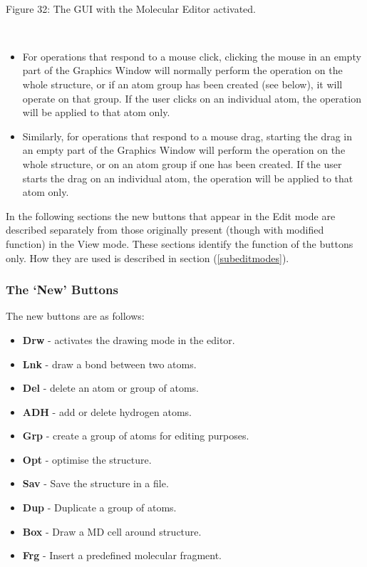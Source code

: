 ~

\begin{center}
\centerline{}
\centerline{Figure 32: The GUI with the Molecular Editor activated.}
\end{center}

~

\noindent
\begin{itemize}
\item For operations that respond to a mouse click, clicking the mouse in an
  empty part of the Graphics Window will normally perform the operation on the
  whole structure, or if an atom group has been created (see below), it will
  operate on that group. If the user clicks on an individual atom, the
  operation will be applied to that atom only.
\item Similarly, for operations that respond to a mouse drag, starting the
  drag in an empty part of the Graphics Window will perform the operation on
  the whole structure, or on an atom group if one has been created. If the
  user starts the drag on an individual atom, the operation will be applied to
  that atom only.
\end{itemize}

In the following sections the new buttons that appear in the Edit mode are
described separately from those originally present (though with modified
function) in the View mode. These sections identify the function of the
buttons only. How they are used is described in section (\ref{subeditmodes}).

\subsubsection{The `New' Buttons}

The new buttons are as follows:

\begin{itemize}
\item {\bf Drw} - activates the drawing mode in the editor.
\item {\bf Lnk} - draw a bond between two atoms.
\item {\bf Del} - delete an atom or group of atoms.
\item {\bf ADH} - add or delete hydrogen atoms.
\item {\bf Grp} - create a group of atoms for editing purposes.
\item {\bf Opt} - optimise the structure.
\item {\bf Sav} - Save the structure in a file.
\item {\bf Dup} - Duplicate a group of atoms.
\item {\bf Box} - Draw a MD cell around structure.
\item {\bf Frg} - Insert a predefined molecular fragment.
\end{itemize}


